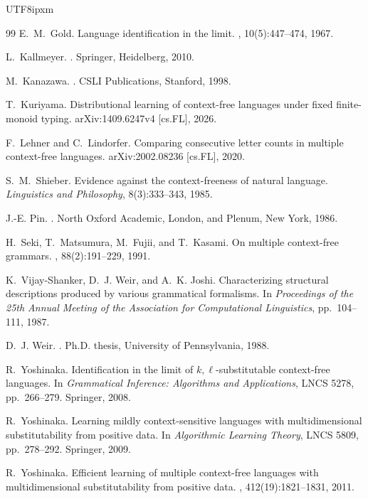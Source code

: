 \documentclass[10pt,a4paper]{article}
\theoremstyle{remark}
\begin{document}
\begin{CJK}{UTF8}{ipxm}
\begin{thebibliography}{99}
E.~M.~Gold.
\newblock Language identification in the limit.
, 10(5):447--474, 1967.

L.~Kallmeyer.
.
\newblock Springer, Heidelberg, 2010.

M.~Kanazawa.
.
\newblock CSLI Publications, Stanford, 1998.

T.~Kuriyama.
\newblock Distributional learning of context-free languages under fixed finite-monoid typing.
\newblock arXiv:1409.6247v4 [cs.FL], 2026.

F.~Lehner and C.~Lindorfer.
\newblock Comparing consecutive letter counts in multiple context-free languages.
\newblock arXiv:2002.08236 [cs.FL], 2020.

S.~M.~Shieber.
\newblock Evidence against the context-freeness of natural language.
\newblock \emph{Linguistics and Philosophy}, 8(3):333--343, 1985.

J.-E. Pin.
.
\newblock North Oxford Academic, London, and Plenum, New York, 1986.

H.~Seki, T.~Matsumura, M.~Fujii, and T.~Kasami.
\newblock On multiple context-free grammars.
, 88(2):191--229, 1991.

K.~Vijay-Shanker, D.~J. Weir, and A.~K. Joshi.
\newblock Characterizing structural descriptions produced by various grammatical formalisms.
\newblock In {\em Proceedings of the 25th Annual Meeting of the Association for
Computational Linguistics}, pp.~104--111, 1987.

D.~J. Weir.
.
\newblock Ph.D. thesis, University of Pennsylvania, 1988.

R.~Yoshinaka.
\newblock Identification in the limit of \(k,\ell\)-substitutable context-free
languages.
\newblock In {\em Grammatical Inference: Algorithms and Applications}, LNCS
5278, pp.~266--279. Springer, 2008.

R.~Yoshinaka.
\newblock Learning mildly context-sensitive languages with multidimensional
substitutability from positive data.
\newblock In {\em Algorithmic Learning Theory}, LNCS 5809, pp.~278--292.
Springer, 2009.

R.~Yoshinaka.
\newblock Efficient learning of multiple context-free languages with
multidimensional substitutability from positive data.
, 412(19):1821--1831, 2011.

\end{thebibliography}

\end{CJK}
\end{document}
